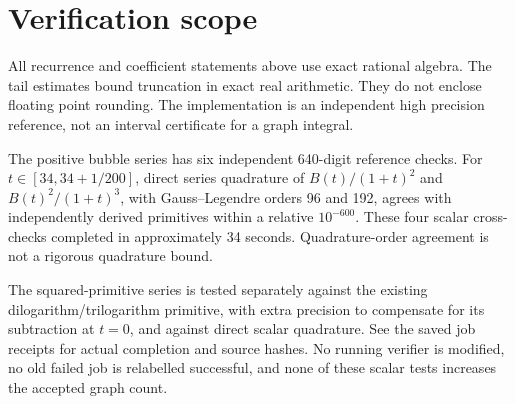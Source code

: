 \documentclass[11pt]{article}
\begin{document}
\section{Verification scope}
All recurrence and coefficient statements above use exact rational algebra.
The tail estimates bound truncation in exact real arithmetic. They do not
enclose floating point rounding. The implementation is an independent
high precision reference, not an interval certificate for a graph integral.

The positive bubble series has six independent 640-digit reference checks.
For \(t\in[34,34+1/200]\), direct series quadrature of
\(B(t)/(1+t)^2\) and \(B(t)^2/(1+t)^3\), with Gauss--Legendre orders 96 and
192, agrees with independently derived primitives within a relative
\(10^{-600}\). These four scalar cross-checks completed in approximately
34 seconds. Quadrature-order agreement is not a rigorous quadrature bound.

The squared-primitive series is tested separately against the existing
dilogarithm/trilogarithm primitive, with extra precision to compensate for
its subtraction at \(t=0\), and against direct scalar quadrature.
See the saved job receipts for actual completion and source hashes.
No running verifier is modified, no old failed job is relabelled successful,
and none of these scalar tests increases the accepted graph count.
\end{document}
